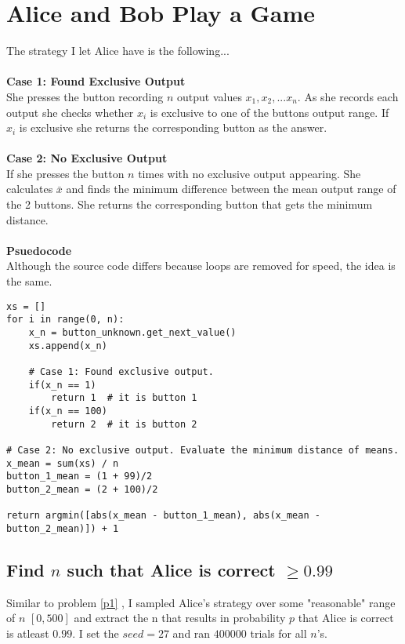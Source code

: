 \documentclass[twocolumn]{article}
\begin{document}
\section{Alice and Bob Play a Game}
The strategy I let Alice have is the following...
\\\\
\noindent
\textbf{Case 1: Found Exclusive Output}\\
She presses the button recording $n$ output values $x_1, x_2, ... x_n$.
As she records each output she checks whether $x_i$ is exclusive to one of the buttons output range. If $x_i$ is exclusive she returns the corresponding button as the answer.
\\\\
\textbf{Case 2: No Exclusive Output}\\
If she presses the button $n$ times with no exclusive output appearing. She calculates $\bar{x}$ and finds the minimum difference between the mean output range of the 2 buttons. She returns the corresponding button that gets the minimum distance.
\\\\
\textbf{Psuedocode}\\
Although the source code differs because loops are removed for speed, the idea is the same.
\begin{lstlisting}
xs = []
for i in range(0, n):	
	x_n = button_unknown.get_next_value()
	xs.append(x_n) 	
	
	# Case 1: Found exclusive output.
	if(x_n == 1)
		return 1  # it is button 1
	if(x_n == 100)
		return 2  # it is button 2
		
# Case 2: No exclusive output. Evaluate the minimum distance of means.
x_mean = sum(xs) / n
button_1_mean = (1 + 99)/2
button_2_mean = (2 + 100)/2

return argmin([abs(x_mean - button_1_mean), abs(x_mean - button_2_mean)]) + 1
\end{lstlisting}

\subsection*{Find $n$ such that Alice is correct $\ge 0.99$}
Similar to problem \ref{p1} , I sampled Alice's strategy over some "reasonable" range of $n$ $[0, 500]$ and extract the n that results in probability $p$ that Alice is correct is atleast $0.99$. I set the $seed=27$ and  ran $400000$ trials for all $n$'s.
\end{document}
